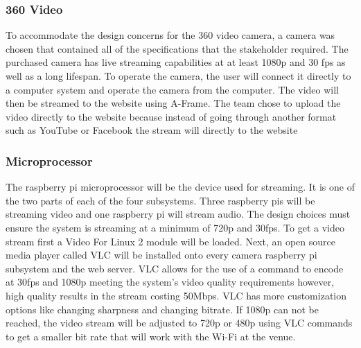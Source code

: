 \documentclass[onecolumn, draftclsnofoot,10pt, compsoc]{IEEEtran}
\begin{document}
        \subsubsection{360 Video}
        To accommodate the design concerns for the 360 video camera, a camera was chosen that contained all of the specifications that the stakeholder required.
        The purchased camera has live streaming capabilities at at least 1080p and 30 fps as well as a long lifespan.
        To operate the camera, the user will connect it directly to a computer system and operate the camera from the computer.
        The video will then be streamed to the website using A-Frame.
        The team chose to upload the video directly to the website because instead of going through another format such as YouTube or Facebook the stream will directly to the website 
        
        \subsubsection{Microprocessor}
        The raspberry pi microprocessor will be the device used for streaming. 
        It is one of the two parts of each of the four subsystems.
        Three raspberry pis will be streaming video and one raspberry pi will stream audio. 
        The design choices must ensure the system is streaming at a minimum of 720p and 30fps. 
        To get a video stream first a Video For Linux 2 module will be loaded. 
        Next, an open source media player called VLC will be installed onto every camera raspberry pi subsystem and the web server. 
        VLC allows for the use of a command to encode at 30fps and 1080p meeting the system’s video quality requirements however, high quality results in the stream costing 50Mbps.
        VLC has more customization options like changing sharpness and changing bitrate. 
        If 1080p can not be reached, the video stream will be adjusted to 720p or 480p using VLC commands to get a smaller bit rate that will work with the Wi-Fi at the venue. 
        
\end{document}
